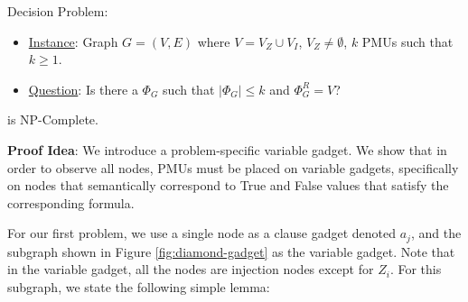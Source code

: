 \full Decision Problem:
\begin{itemize}
	\item \underline{Instance}: Graph $G=(V,E)$ where $V=V_Z \cup V_I$, $V_Z \neq \emptyset$, $k$ PMUs such that $k \geq 1$.

	\item \underline{Question}: Is there a $\Phi_G$ such that $|\Phi_G| \leq k$ and $\Phi^R_G = V$?
\end{itemize}


\begin{theorem}
\full is NP-Complete. %
\label{thm:npc-full}
\end{theorem}

{\bf Proof Idea}:  We introduce a problem-specific variable gadget. We show that in order to observe all nodes, PMUs must be placed on variable gadgets, specifically on
nodes that semantically correspond to True and False values that satisfy the corresponding \sat formula. 

For our first problem, we use a single node as a clause gadget denoted $a_j$, and the subgraph shown in Figure \ref{fig:diamond-gadget} as the variable gadget. Note that in the variable gadget, all the nodes are injection nodes except for $Z_i$. For this subgraph, we state the following simple lemma:

